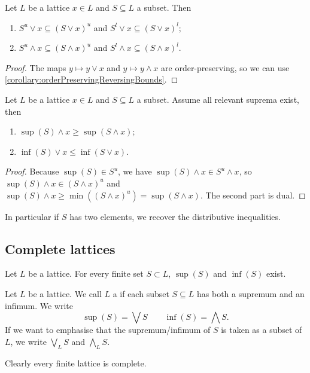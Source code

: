 \begin{lemma}
Let $L$ be a lattice $x\in L$ and $S\subseteq L$ a subset. Then
\begin{enumerate}
\item $S^u\vee x \subseteq (S\vee x)^u$ and $S^l\vee x \subseteq (S\vee x)^l$;
\item $S^u\wedge x \subseteq (S\wedge x)^u$ and $S^l\wedge x \subseteq (S\wedge x)^l$.
\end{enumerate}
\end{lemma}
\begin{proof}
The maps $y\mapsto y\vee x$ and $y\mapsto y \wedge x$ are order-preserving, so we can use \ref{corollary:orderPreservingReversingBounds}.
\end{proof}
\begin{corollary}
Let $L$ be a lattice $x\in L$ and $S\subseteq L$ a subset. Assume all relevant suprema exist, then
\begin{enumerate}
\item $\sup(S)\wedge x \geq \sup(S \wedge x)$;
\item $\inf(S)\vee x \leq \inf(S \vee x)$.
\end{enumerate}
\end{corollary}
\begin{proof}
Because $\sup(S)\in S^u$, we have $\sup(S)\wedge x \in S^u\wedge x$, so $\sup(S)\wedge x \in (S\wedge x)^u$ and $\sup(S)\wedge x \geq \min((S\wedge x)^u) = \sup(S\wedge x)$. The second part is dual.
\end{proof}
In particular if $S$ has two elements, we recover the distributive inequalities.


\subsection{Complete lattices}
\begin{lemma}
Let $L$ be a lattice. For every finite set $S\subset L$, $\sup(S)$ and $\inf(S)$ exist.
\end{lemma}
\begin{definition}
Let $L$ be a lattice. We call $L$ a  if each subset $S\subseteq L$ has both a supremum and an infimum. We write
\[ \sup(S) = \bigvee S \qquad \inf(S) = \bigwedge S. \]
If we want to emphasise that the supremum/infimum of $S$ is taken as a subset of $L$, we write $\bigvee_L S$ and $\bigwedge_L S$.
\end{definition}
Clearly every finite lattice is complete.


